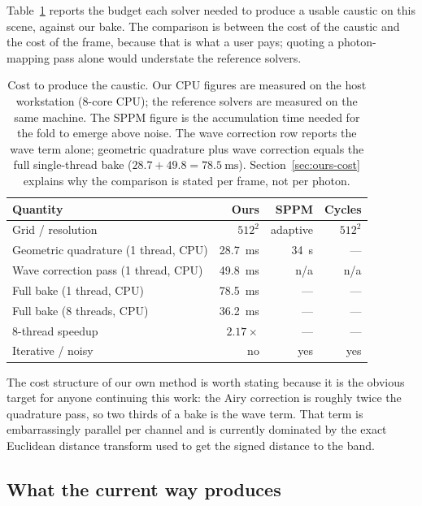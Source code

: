 Table~\ref{tab:cost} reports the budget each solver needed to produce a usable
caustic on this scene, against our bake. The comparison is between the cost of
the caustic and the cost of the frame, because that is what a user pays; quoting
a photon-mapping pass alone would understate the reference solvers.

\begin{table}[tp]
\centering
\caption{Cost to produce the caustic. Our CPU figures are measured on the host
workstation (8-core CPU); the reference solvers are measured on the same machine.
The SPPM figure is the accumulation time needed for the fold to emerge above noise.
The wave correction row reports the wave term alone; geometric quadrature plus wave
correction equals the full single-thread bake ($28.7 + 49.8 = \SI{78.5}{\milli\second}$).
Section~\ref{sec:ours-cost} explains why the comparison is stated per frame,
not per photon.}
\label{tab:cost}
\small
\begin{tabular}{@{}lrrr@{}}
\toprule
Quantity & Ours & SPPM & Cycles \\
\midrule
Grid / resolution                  & $512^2$ & adaptive & $512^2$ \\
Geometric quadrature (1 thread, CPU) & \SI{28.7}{\milli\second} & \SI{34}{\second} & --- \\
Wave correction pass (1 thread, CPU) & \SI{49.8}{\milli\second} & n/a & n/a \\
Full bake (1 thread, CPU)          & \SI{78.5}{\milli\second} & --- & --- \\
Full bake (8 threads, CPU)         & \SI{36.2}{\milli\second} & --- & --- \\
8-thread speedup                   & $2.17\times$ & --- & --- \\
Iterative / noisy                  & no & yes & yes \\
\bottomrule
\end{tabular}
\end{table}

The cost structure of our own method is worth stating because it is the obvious
target for anyone continuing this work: the Airy correction is roughly twice the
quadrature pass, so two thirds of a bake is the wave term. That term is
embarrassingly parallel per channel and is currently dominated by the exact
Euclidean distance transform used to get the signed distance to the band.

\subsection{What the current way produces}
\label{sec:current-quality}

